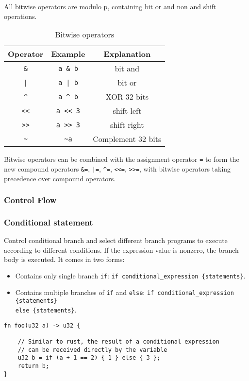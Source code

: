 All bitwise operators are modulo p, containing bit or and non and shift operations.
\begin{table}
\centering
\begin{tabular}{c|c|c}
    Operator & Example & Explanation \\ \hline
    \verb|&| & \verb|a & b| & bit and \\
    \verb!|! & \verb!a | b! & bit or \\
    \verb|^| & \verb|a ^ b| & XOR 32 bits \\
    \verb|<<| & \verb|a << 3| & shift left \\
    \verb|>>| & \verb|a >> 3| & shift right \\
    \verb|~| & \verb|~a| & Complement 32  bits \\
\end{tabular}
\caption{Bitwise operators}
\end{table}

Bitwise operators can be combined with the assignment operator \verb|=| to form the new compound operators \verb|&=|, \verb!|=!, \verb|^=|, \verb|<<=|, \verb|>>=|, 
with bitwise operators taking precedence over compound operators.

\subsubsection{Control Flow}

\subsubsection*{Conditional statement}

Control conditional branch and select different branch programs to execute according to different conditions. 
If the expression value is nonzero, the branch body is executed.
It comes in two forms:

\begin{itemize}
    \item Contains only single branch \verb|if|: \verb|if conditional_expression {statements}|.
    \item Contains multiple branches of \verb|if| and \verb|else|: 
    \verb|if conditional_expression {statements}| \\
    \verb|else {statements}|.

\end{itemize}

\begin{lstlisting}
fn foo(u32 a) -> u32 {
    
    // Similar to rust, the result of a conditional expression 
    // can be received directly by the variable
    u32 b = if (a + 1 == 2) { 1 } else { 3 };
    return b;
}
\end{lstlisting}

